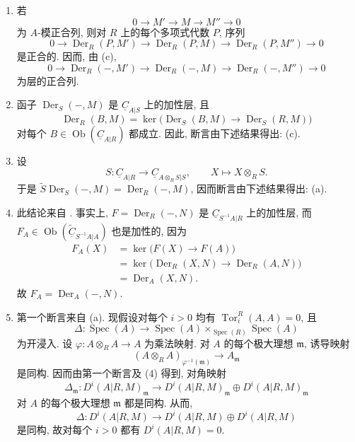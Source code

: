 \begin{enumerate}[label=(\arabic*)]
\item 若
\[
 0\longrightarrow M'\longrightarrow M\longrightarrow M''
 \longrightarrow0
\]
为 $A$-模正合列, 则对 $R$ 上的每个多项式代数 $P$, 序列
\[
 0\longrightarrow\operatorname{Der}_R(P,M')
 \longrightarrow\operatorname{Der}_R(P,M)
 \longrightarrow\operatorname{Der}_R(P,M'')
 \longrightarrow0
\]
是正合的. 因而, 由 (c),
\[
 0\longrightarrow\operatorname{Der}_R(-,M')
 \longrightarrow\operatorname{Der}_R(-,M)
 \longrightarrow\operatorname{Der}_R(-,M'')
 \longrightarrow0
\]
为层的正合列.

\item 函子 $\operatorname{Der}_S(-,M)$ 是 $\underline C_{A|S}$ 上的加性层, 且
\[
 \operatorname{Der}_R(B,M)
 =\ker\bigl(\operatorname{Der}_S(B,M)
 \longrightarrow\operatorname{Der}_S(R,M)\bigr)
\]
对每个 $B\in\operatorname{Ob}(\underline C_{A|R})$ 都成立. 因此, 断言由下述结果得出: (c).

\item 设
\[
 S:\underline C_{A|R}\longrightarrow
 \underline C_{A\otimes_RS|S},
 \qquad X\longmapsto X\otimes_RS.
\]
于是 $\widetilde S\operatorname{Der}_S(-,M)
=\operatorname{Der}_R(-,M)$, 因而断言由下述结果得出: (a).


\item 此结论来自 . 事实上, $F=\operatorname{Der}_R(-,N)$ 是 $\underline C_{S^{-1}A|R}$ 上的加性层, 而 $F_A\in\operatorname{Ob}
(\widetilde{\underline C}_{S^{-1}A|A})$ 也是加性的, 因为
\begin{align*}
 F_A(X)
 &=\ker\bigl(F(X)\longrightarrow F(A)\bigr)\\
 &=\ker\bigl(\operatorname{Der}_R(X,N)
   \longrightarrow\operatorname{Der}_R(A,N)\bigr)\\
 &=\operatorname{Der}_A(X,N).
\end{align*}
故 $F_A=\operatorname{Der}_A(-,N)$.

\item 第一个断言来自 (a). 现假设对每个 $i>0$ 均有 $\operatorname{Tor}_i^R(A,A)=0$, 且
\[
 \Delta:\operatorname{Spec}(A)\longrightarrow
 \operatorname{Spec}(A)\times_{\operatorname{Spec}(R)}
 \operatorname{Spec}(A)
\]
为开浸入. 设 $\varphi:A\otimes_RA\longrightarrow A$ 为乘法映射. 对 $A$ 的每个极大理想 $\mathfrak m$, 诱导映射
\[
 (A\otimes_RA)_{\varphi^{-1}(\mathfrak m)}
 \longrightarrow A_{\mathfrak m}
\]
是同构. 因而由第一个断言及 (4) 得到, 对角映射
\[
 \Delta_{\mathfrak m}:D^i(A|R,M)_{\mathfrak m}
 \longrightarrow D^i(A|R,M)_{\mathfrak m}
 \oplus D^i(A|R,M)_{\mathfrak m}
\]
对 $A$ 的每个极大理想 $\mathfrak m$ 都是同构. 从而,
\[
 \Delta:D^i(A|R,M)\longrightarrow
 D^i(A|R,M)\oplus D^i(A|R,M)
\]
是同构, 故对每个 $i>0$ 都有 $D^i(A|R,M)=0$.


\end{enumerate}
